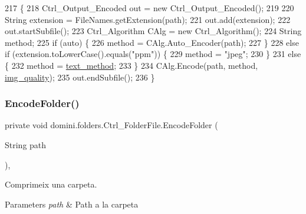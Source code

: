 \begin{DoxyCode}
217                                          \{
218         Ctrl\_Output\_Encoded out = \textcolor{keyword}{new} Ctrl\_Output\_Encoded();
219 
220         String extension = FileNames.getExtension(path);
221         out.add(extension);
222         out.startSubfile();
223         Ctrl\_Algorithm CAlg = \textcolor{keyword}{new} Ctrl\_Algorithm();
224         String method;
225         \textcolor{keywordflow}{if} (\textcolor{keyword}{auto}) \{
226             method = CAlg.Auto\_Encoder(path);
227         \}
228         \textcolor{keywordflow}{else} \textcolor{keywordflow}{if} (extension.toLowerCase().equals(\textcolor{stringliteral}{"ppm"})) \{
229             method = \textcolor{stringliteral}{"jpeg"};
230         \}
231         \textcolor{keywordflow}{else} \{
232             method = \hyperlink{classdomini_1_1folders_1_1Ctrl__FolderFile_a75ef571be454360b835f552d2cf20741}{text\_method};
233         \}
234         CAlg.Encode(path, method, \hyperlink{classdomini_1_1folders_1_1Ctrl__FolderFile_a7990a74c394d53a58ebbf4a7872c700d}{img\_quality});
235         out.endSubfile();
236     \}
\end{DoxyCode}
\mbox{\label{classdomini_1_1folders_1_1Ctrl__FolderFile_a6b18175639009f0186307710fb88a18f}} 
\subsubsection{\texorpdfstring{Encode\+Folder()}{EncodeFolder()}}
{\footnotesize\ttfamily private void domini.\+folders.\+Ctrl\+\_\+\+Folder\+File.\+Encode\+Folder (\begin{DoxyParamCaption}\item[{String}]{path }\end{DoxyParamCaption})\hspace{0.3cm}{\ttfamily [inline]}, {\ttfamily [private]}}



Comprimeix una carpeta. 


\begin{DoxyParams}{Parameters}
{\em path} & Path a la carpeta \\
\hline
\end{DoxyParams}

